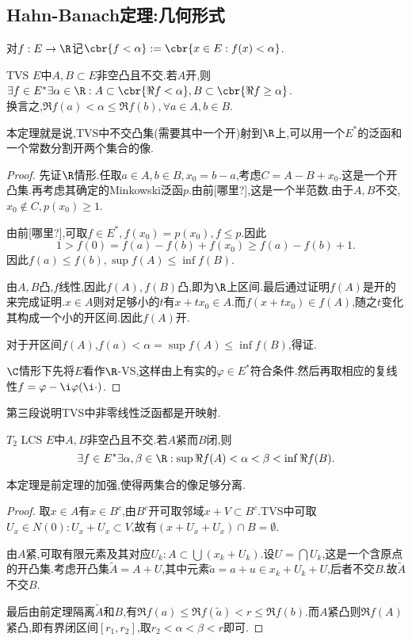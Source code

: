 \documentclass{article}
\begin{document}
\subsection{Hahn-Banach定理:几何形式}
对$f:E\to \R$记$\cbr{f<\alpha}:=\cbr{x\in E:f(x)<\alpha}$.
\begin{theorem}
    TVS $E$中$A,B\subset E$非空凸且不交.若$A$开,则$\exists f\in E^*\exists \alpha\in \R:A\subset \cbr{\Re f<\alpha}, B\subset \cbr{\Re f\geq \alpha}$.\\
    换言之,$\Re f(a)<\alpha\leq \Re f(b),\forall a\in A,b\in B$.

    本定理就是说,TVS中不交凸集(需要其中一个开)射到$\R$上,可以用一个$E^*$的泛函和一个常数分割开两个集合的像.
\end{theorem}
\begin{proof}
    先证$\R$情形.任取$a\in A,b\in B,x_0=b-a$,考虑$C=A-B+x_0$.这是一个开凸集.再考虑其确定的Minkowski泛函$p$.由前[哪里?],这是一个半范数.由于$A,B$不交,$x_0\notin C, p(x_0)\geq 1$.

    由前[哪里?],可取$f\in E^*,f(x_0)=p(x_0),f\leq p$.因此$$1>f(0)=f(a)-f(b)+f(x_0)\geq f(a)-f(b)+1.$$
    因此$f(a)\leq f(b), \sup f(A)\leq \inf f(B)$.

    由$A,B$凸,$f$线性,因此$f(A),f(B)$凸,即为$\R$上区间.最后通过证明$f(A)$是开的来完成证明.$x\in A$则对足够小的$t$有$x+tx_0\in A$.而$f(x+tx_0)\in f(A)$,随之$t$变化其构成一个小的开区间.因此$f(A)$开.

    对于开区间$f(A)$,$f(a)<\alpha=\sup f(A)\leq \inf f(B)$,得证.

    $\C$情形下先将$E$看作$\R$-VS,这样由上有实的$\varphi\in E^*$符合条件.然后再取相应的复线性$f=\varphi-\i \varphi(\i\cdot)$.
\end{proof}
\begin{remark}
    第三段说明TVS中非零线性泛函都是开映射.
\end{remark}
\begin{theorem}\label{HBThm4}
    $T_2$ LCS $E$中$A,B$非空凸且不交.若$A$紧而$B$闭,则$$\exists f\in E^*\exists \alpha,\beta\in \R:\sup \Re f(A)<\alpha<\beta<\inf \Re f(B).$$

    本定理是前定理的加强,使得两集合的像足够分离.
\end{theorem}
\begin{proof}
    取$x\in A$有$x\in B^c$,由$B^c$开可取邻域$x+V\subset B^c$.TVS中可取$U_x\in N(0):U_x+U_x\subset V$,故有$(x+U_x+U_x)\cap B=\emptyset$.

    由$A$紧,可取有限元素及其对应$U_k: A\subset \bigcup(x_k+U_k)$.设$U=\bigcap U_k$,这是一个含原点的开凸集.考虑开凸集$\tilde{A}=A+U$,其中元素$\tilde{a}=a+u\in x_k+U_k+U$,后者不交$B$.故$\tilde{A}$不交$B$.

    最后由前定理隔离$\tilde{A}$和$B$,有$\Re f(a)\leq \Re f(\tilde{a})<r\leq \Re f(b)$.而$A$紧凸则$\Re f(A)$紧凸,即有界闭区间$[r_1,r_2]$,取$r_2<\alpha<\beta<r$即可.
\end{proof}
\end{document}
